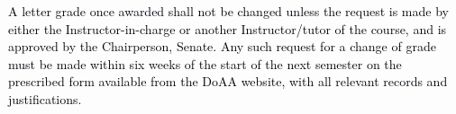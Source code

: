 \documentclass[12pt]{article}
\begin{document}
\vspace{\baselineskip}
\begin{justify}
{\fontsize{10pt}{12.0pt}\selectfont \textcolor[HTML]{00000A}{A letter grade once awarded shall not be changed unless the request is made by either the Instructor-in-charge or another Instructor/tutor of the course, and is approved by the Chairperson, Senate. Any such request for a change of grade must be made within six weeks of the start of the next semester on the prescribed form available from the DoAA website, with all relevant records and justifications.}\par}
\end{justify}\par


\vspace{\baselineskip}

\vspace{\baselineskip}

\vspace{\baselineskip}

\vspace{\baselineskip}

\vspace{\baselineskip}

\vspace{\baselineskip}

\vspace{\baselineskip}

\vspace{\baselineskip}

\vspace{\baselineskip}

\vspace{\baselineskip}

\vspace{\baselineskip}

\vspace{\baselineskip}

\vspace{\baselineskip}

\vspace{\baselineskip}

\vspace{\baselineskip}

\vspace{\baselineskip}

\vspace{\baselineskip}

\vspace{\baselineskip}
\end{document}
